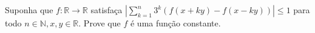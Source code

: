 Suponha que \(f\colon  \mathbb{R}\to\mathbb{R}\) satisfaça \(\left|\sum^n_{k=1}3^k\left(f(x+ky)-f(x-ky)\right)\right|\le1\) para todo \(n\in\mathbb{N},x,y\in\mathbb{R}\). Prove que \(f\) é uma função constante.
